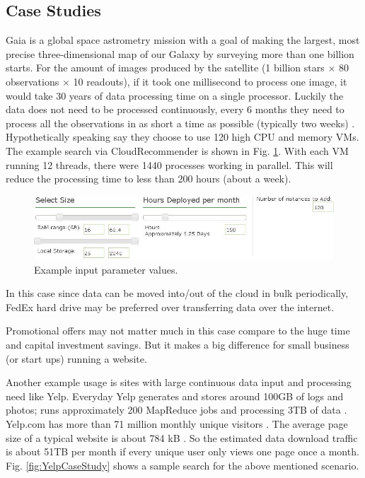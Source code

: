 \subsection{Case Studies}
\label{sec:case_studies}
Gaia is a global space astrometry mission with a goal of making the largest, most precise three-dimensional map of our Galaxy by surveying more than one billion starts. For the amount of images produced by the satellite (1 billion stars $\times$ 80 observations $\times$ 10 readouts), if it took one millisecond to process one image, it would take 30 years of data processing time on a single processor. Luckily the data does not need to be processed continuously, every 6 months they need to process all the observations in as short a time as possible (typically two weeks) \cite{GaiaCaseStudy}.
Hypothetically speaking say they choose to use 120 high CPU and memory VMs. The example search via CloudRecommender is shown in Fig. \ref{fig:GaiaCaseStudy}. With each VM running 12 threads, there were 1440 processes working in parallel. This will reduce the processing time to less than 200 hours (about a week).

\begin{figure}
  \includegraphics[width=\textwidth,keepaspectratio]{Figures/system/CloudRecommender/GaiaCaseStudy.jpg}
  \caption{Example input parameter values.}
  \label{fig:GaiaCaseStudy}
\end{figure}

In this case since data can be moved into/out of the cloud in bulk periodically, FedEx hard drive may be preferred over transferring data over the internet.

Promotional offers may not matter much in this case compare to the huge time and capital investment savings. But it makes a big difference for small business (or start ups) running a website.

Another example usage is sites with large continuous data input and processing need like Yelp. Everyday Yelp generates and stores around 100GB of logs and photos; runs approximately 200 MapReduce jobs and processing 3TB of data \cite{YelpCaseStudy}. Yelp.com has more than 71 million monthly unique visitors \cite{YelpFactsheet}. The average page size of a typical website is about 784 kB \cite{Pingdom}. So the estimated data download traffic is about 51TB per month if every unique user only views one page once a month. Fig. \ref{fig:YelpCaseStudy} shows a sample search for the above mentioned scenario.

